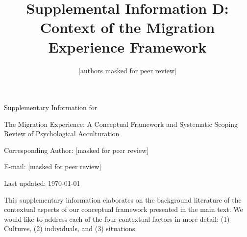 \documentclass[man, 12pt, a4paper]{apa7}
\title{Supplemental Information D: Context of the Migration Experience Framework}
\author{[authors masked for peer review]}
\begin{document}
\begin{titlepage}
	{\noindent\Large Supplementary Information for \par}
	\vspace{0.5cm}
	{\noindent\Large The Migration Experience: A Conceptual Framework and Systematic Scoping Review of Psychological Acculturation\par}
	\vspace{1.5cm}
	{\noindent\LARGE\bfseries \thetitle \par}
	\vspace{2cm}
	{\noindent\Large\itshape \theauthor \par}
	\vfill
	\noindent Corresponding Author: [masked for peer review]\par
	\noindent E-mail: [masked for peer review]\par
	\vfill

	{\noindent Last updated: \today\par}
\end{titlepage}

\begin{center}
   \textbf{\thetitle} 
\end{center}

This supplementary information elaborates on the background literature of the contextual aspects of our conceptual framework presented in the main text. We would like to address each of the four contextual factors in more detail: (1) Cultures, (2) individuals, and (3) situations.

\end{document}
